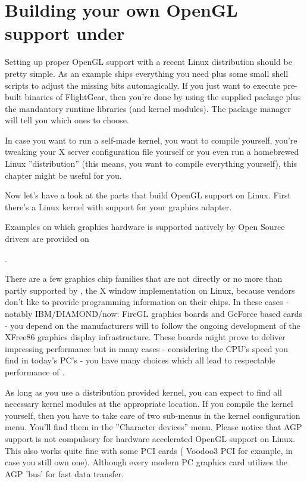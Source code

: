 \section{Building your own OpenGL support under \label{ownopengl}}

Setting up proper OpenGL support with a recent Linux
distribution should be pretty simple. As an example  ships
everything you need plus some small shell scripts to adjust the missing bits
automagically. If you just want to execute pre-built binaries of FlightGear,
then you're done by using the supplied \FlightGear{} package plus the
mandantory runtime libraries (and kernel modules). The package manager will
tell you which ones to choose.

In case you want to run a self-made kernel, you want to compile
\FlightGear{} yourself, you're tweaking your X server configuration file
yourself or you even run a homebrewed Linux ''distribution'' (this means,
you want to compile everything yourself), this chapter might be useful for
you.

Now let's have a look at the parts that build OpenGL support on Linux. First
there's a Linux kernel with support for your graphics adapter.

Examples on which graphics hardware is supported natively by Open Source
drivers are provided on
\medskip

\noindent
{}.
\medskip

There are a few graphics chip families that are not directly or no more than
partly supported by , the X window implementation on Linux,
because vendors don't like to provide programming information on their
chips. In these cases - notably IBM/DIAMOND/now:  FireGL graphics
boards and  GeForce based cards - you depend on the
manufacturers will to follow the ongoing development of the XFree86 graphics
display infrastructure. These boards might prove to deliver impressing
performance but in many cases - considering the CPU's speed you find in
today's PC's - you have many choices which all lead to respectable
performance of \FlightGear{}.

As long as you use a distribution provided kernel, you can expect to find
all necessary kernel modules at the appropriate location. If you compile the
kernel yourself, then you have to take care of two sub-menus in the kernel
configuration menu. You'll find them in the ''Character devices'' menu.
Please notice that AGP support is not compulsory for hardware accelerated
OpenGL support on Linux. This also works quite fine with some PCI cards
( Voodoo3 PCI for example, in case you still own one). Although
every modern PC graphics card utilizes the AGP 'bus' for fast data transfer.

